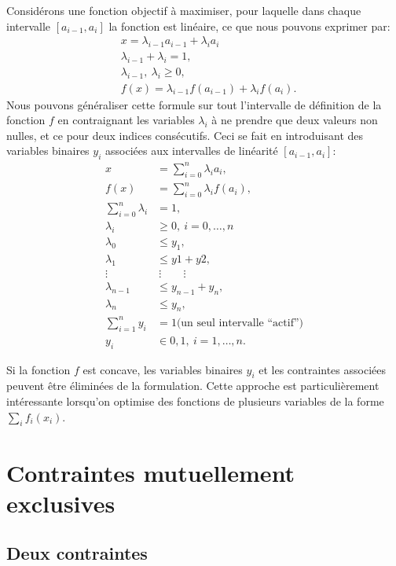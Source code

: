 \begin{example}
Considérons une fonction objectif à maximiser, pour laquelle dans chaque intervalle
$[a_{i-1}, a_i]$ la fonction est linéaire, ce que nous pouvons exprimer par:
\begin{align*}
& x = \lambda_{i-1}a_{i-1} + \lambda_ia_i \\
& \lambda_{i-1} + \lambda_i = 1, \\
& \lambda_{i-1},\ \lambda_i \geq 0, \\
& f(x) = \lambda_{i-1}f(a_{i-1}) + \lambda_if(a_i).
\end{align*}
Nous pouvons généraliser cette formule sur tout l'intervalle de définition de la fonction $f$ en contraignant les variables $\lambda_i$ à ne prendre que deux valeurs non nulles, et ce pour deux indices consécutifs.
Ceci se fait en introduisant des variables binaires $y_i$ associées aux intervalles de linéarité $[a_{i-1}, a_i]$:
\begin{align*}
x &= \sum_{i = 0}^n \lambda_i a_i, \\
f(x) &= \sum_{i = 0}^n \lambda_i f(a_i), \\
\sum_{i = 0}^n \lambda_i &= 1, \\
\lambda_i & \geq 0,\ i = 0,\ldots, n \\
\lambda_0 & \leq y_1, \\
\lambda_1 & \leq y1 + y2, \\
\vdots\ &\ \vdots\qquad \vdots \\
\lambda_{n-1} & \leq y_{n-1} + y_n, \\
\lambda_n & \leq y_n,\\
\sum_{i = 1}^n y_i & = 1 \mbox{(un seul intervalle ``actif'')} \\
y_i & \in {0, 1},\ i = 1,\ldots, n.
\end{align*}

Si la fonction $f$ est concave, les variables binaires $y_i$ et les contraintes associées peuvent être éliminées de la formulation.
Cette approche est particulièrement intéressante lorsqu'on optimise des fonctions de plusieurs variables de la forme $\sum_i f_i(x_i)$.
\end{example}

\section{Contraintes mutuellement exclusives}

\subsection{Deux contraintes}

